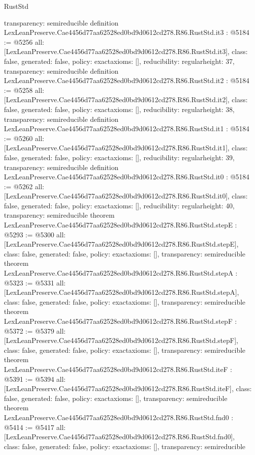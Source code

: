 \begin{lexlean}{RustStd}
\begin{coremodule}
{  transparency: semireducible
}
definition LexLeanPreserve.Cae4456d77aa62528ed0bd9d0612cd278.R86.RustStd.it3 : @5184 := @5256 {
  all: [LexLeanPreserve.Cae4456d77aa62528ed0bd9d0612cd278.R86.RustStd.it3],
  class: false,
  generated: false,
  policy: exact{axioms: []},
  reducibility: regular{height: 37},
  transparency: semireducible
}
definition LexLeanPreserve.Cae4456d77aa62528ed0bd9d0612cd278.R86.RustStd.it2 : @5184 := @5258 {
  all: [LexLeanPreserve.Cae4456d77aa62528ed0bd9d0612cd278.R86.RustStd.it2],
  class: false,
  generated: false,
  policy: exact{axioms: []},
  reducibility: regular{height: 38},
  transparency: semireducible
}
definition LexLeanPreserve.Cae4456d77aa62528ed0bd9d0612cd278.R86.RustStd.it1 : @5184 := @5260 {
  all: [LexLeanPreserve.Cae4456d77aa62528ed0bd9d0612cd278.R86.RustStd.it1],
  class: false,
  generated: false,
  policy: exact{axioms: []},
  reducibility: regular{height: 39},
  transparency: semireducible
}
definition LexLeanPreserve.Cae4456d77aa62528ed0bd9d0612cd278.R86.RustStd.it0 : @5184 := @5262 {
  all: [LexLeanPreserve.Cae4456d77aa62528ed0bd9d0612cd278.R86.RustStd.it0],
  class: false,
  generated: false,
  policy: exact{axioms: []},
  reducibility: regular{height: 40},
  transparency: semireducible
}
theorem LexLeanPreserve.Cae4456d77aa62528ed0bd9d0612cd278.R86.RustStd.stepE : @5293 := @5300 {
  all: [LexLeanPreserve.Cae4456d77aa62528ed0bd9d0612cd278.R86.RustStd.stepE],
  class: false,
  generated: false,
  policy: exact{axioms: []},
  transparency: semireducible
}
theorem LexLeanPreserve.Cae4456d77aa62528ed0bd9d0612cd278.R86.RustStd.stepA : @5323 := @5331 {
  all: [LexLeanPreserve.Cae4456d77aa62528ed0bd9d0612cd278.R86.RustStd.stepA],
  class: false,
  generated: false,
  policy: exact{axioms: []},
  transparency: semireducible
}
theorem LexLeanPreserve.Cae4456d77aa62528ed0bd9d0612cd278.R86.RustStd.stepF : @5372 := @5379 {
  all: [LexLeanPreserve.Cae4456d77aa62528ed0bd9d0612cd278.R86.RustStd.stepF],
  class: false,
  generated: false,
  policy: exact{axioms: []},
  transparency: semireducible
}
theorem LexLeanPreserve.Cae4456d77aa62528ed0bd9d0612cd278.R86.RustStd.iteF : @5391 := @5394 {
  all: [LexLeanPreserve.Cae4456d77aa62528ed0bd9d0612cd278.R86.RustStd.iteF],
  class: false,
  generated: false,
  policy: exact{axioms: []},
  transparency: semireducible
}
theorem LexLeanPreserve.Cae4456d77aa62528ed0bd9d0612cd278.R86.RustStd.fnd0 : @5414 := @5417 {
  all: [LexLeanPreserve.Cae4456d77aa62528ed0bd9d0612cd278.R86.RustStd.fnd0],
  class: false,
  generated: false,
  policy: exact{axioms: []},
  transparency: semireducible
}
\end{coremodule}
\end{lexlean}
